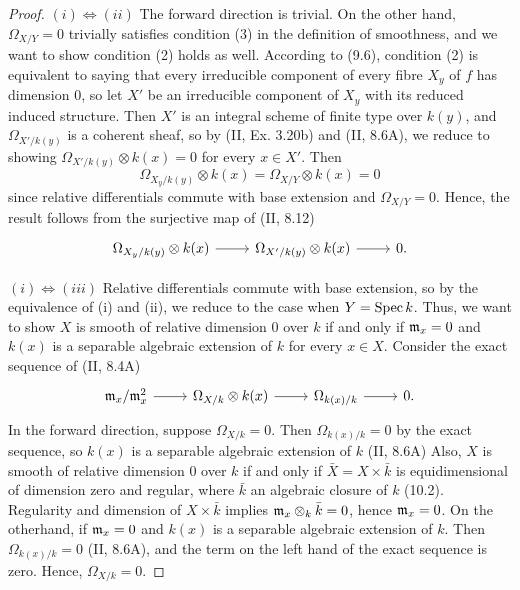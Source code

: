 \documentclass[a4paper]{article}
\begin{document}
\begin{enumerate} [label=\textbf{\arabic*.}, leftmargin=0em]
        \begin{proof}
          $(i) \iff (ii)$ The forward direction is trivial.
          On the other hand, $\Omega_{X/Y} = 0$ trivially satisfies condition (3) in the definition of smoothness, and we want to show condition (2) holds as well.
          According to (9.6), condition (2) is equivalent to saying that every irreducible component of every fibre $X_y$ of $f$ has dimension $0$, so let $X'$ be an irreducible component of $X_y$ with its reduced induced structure.
          Then $X'$ is an integral scheme of finite type over $k(y)$, and $\Omega_{X'/k(y)}$ is a coherent sheaf, so by (II, Ex. 3.20b) and (II, 8.6A),  we reduce to showing $\Omega_{X'/k(y)} \otimes k(x) = 0$ for every $x \in X'$.
          Then
          \begin{equation*}
            \Omega_{X_y / k(y)} \otimes k(x) = \Omega_{X / Y} \otimes k(x) = 0
          \end{equation*}
          since relative differentials commute with base extension and $\Omega_{X / Y} = 0$.
          Hence, the result follows from the surjective map of (II, 8.12)
          \[ \begin{tikzcd}
              \Omega_{X_y/k(y)} \otimes k(x) \arrow[r] & \Omega_{X'/k(y)} \otimes k(x) \arrow[r] & 0.
            \end{tikzcd} \]

          $(i) \iff (iii)$ Relative differentials commute with base extension, so by the equivalence of (i) and (ii), we reduce to the case when $Y = \operatorname{Spec}{k}$.
          Thus, we want to show $X$ is smooth of relative dimension 0 over $k$ if and only if $\mathfrak{m}_x = 0$ and $k(x)$ is a separable algebraic extension of $k$ for every $x \in X$.
          Consider the exact sequence of (II, 8.4A)
          \[ \begin{tikzcd}
              \goth{m}_x/\goth{m}_x^2 \arrow[r] & \Omega_{X/k} \otimes k(x) \arrow[r] & \Omega_{k(x)/k} \arrow[r] & 0.
            \end{tikzcd} \]
          In the forward direction, suppose $\Omega_{X / k} = 0$.
          Then $\Omega_{k(x) / k} = 0$ by the exact sequence, so $k(x)$ is a separable algebraic extension of $k$ (II, 8.6A)
          Also, $X$ is smooth of relative dimension 0 over $k$ if and only if $\bar{X} = X \times \bar{k}$ is equidimensional of dimension zero and regular, where $\bar{k}$ an algebraic closure of $k$ (10.2).
          Regularity and dimension of $X \times \bar{k}$ implies $\mathfrak{m}_x \otimes_k \bar{k} = 0$, hence $\mathfrak{m}_x = 0$.
          On the otherhand, if $\mathfrak{m}_x = 0$ and $k(x)$ is a separable algebraic extension of $k$.
          Then $\Omega_{k(x) / k} = 0$ (II, 8.6A), and the term on the left hand of the exact sequence is zero.
          Hence, $\Omega_{X / k} = 0$.
        \end{proof}


\end{enumerate}
\end{document}
